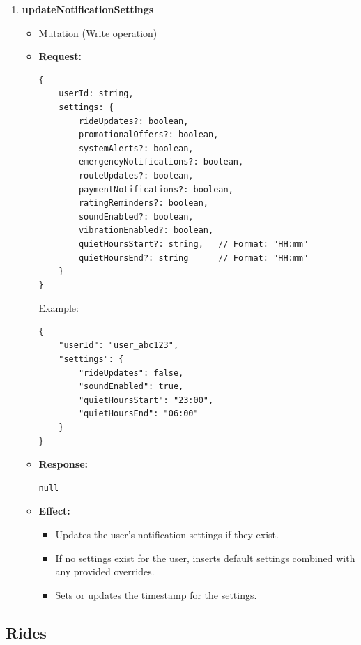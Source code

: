 \documentclass[a4paper,12pt]{article}
\begin{document}
\begin{enumerate}
    \item \textbf{updateNotificationSettings}
    \begin{itemize}
        \item Mutation (Write operation)
        \item \textbf{Request:}
        \begin{verbatim}
{
    userId: string,
    settings: {
        rideUpdates?: boolean,
        promotionalOffers?: boolean,
        systemAlerts?: boolean,
        emergencyNotifications?: boolean,
        routeUpdates?: boolean,
        paymentNotifications?: boolean,
        ratingReminders?: boolean,
        soundEnabled?: boolean,
        vibrationEnabled?: boolean,
        quietHoursStart?: string,   // Format: "HH:mm"
        quietHoursEnd?: string      // Format: "HH:mm"
    }
}
        \end{verbatim}
        Example:
        \begin{verbatim}
{
    "userId": "user_abc123",
    "settings": {
        "rideUpdates": false,
        "soundEnabled": true,
        "quietHoursStart": "23:00",
        "quietHoursEnd": "06:00"
    }
}
        \end{verbatim}
        \item \textbf{Response:}
        \begin{verbatim}
null
        \end{verbatim}
        \item \textbf{Effect:}
        \begin{itemize}
            \item Updates the user's notification settings if they exist.
            \item If no settings exist for the user, inserts default settings combined with any provided overrides.
            \item Sets or updates the timestamp for the settings.
        \end{itemize}
    \end{itemize} 
\end{enumerate}

\subsection*{Rides}
\end{document}

